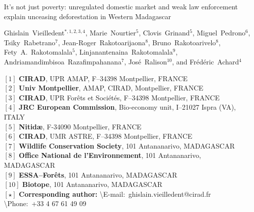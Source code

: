 \begin{center}
  \LARGE{It's not just poverty: unregulated domestic market and weak law enforcement explain unceasing deforestation in Western Madagascar}
\end{center}

\vspace{1cm}

\begin{center}
  \large{Ghislain~Vieilledent$^{*,1,2,3,4}$, Marie~Nourtier$^5$, Clovis~Grinand$^5$, Miguel~Pedrono$^6$,     Tsiky~Rabetrano$^7$, Jean-Roger~Rakotoarijaona$^8$, Bruno~Rakotoarivelo$^8$, Fety~A.~Rakotomalala$^5$, 
  Linjanantenaina~Rakotomalala$^9$, Andriamandimbisoa~Razafimpahanana$^7$, 
  José~Ralison$^{10}$, and Frédéric~Achard$^4$}
\end{center}

\vspace{1cm}

{\small
  \begin{flushleft}
    $[1]$ \textbf{CIRAD}, UPR AMAP, F--34398 Montpellier, FRANCE\\ 
    $[2]$ \textbf{Univ Montpellier}, AMAP, CIRAD, Montpellier, FRANCE\\
    $[3]$ \textbf{CIRAD}, UPR Forêts et Sociétés, F--34398 Montpellier, FRANCE\\
    $[4]$ \textbf{JRC European Commission}, Bio-economy unit, I--21027 Ispra (VA), ITALY\\
    $[5]$ \textbf{Nitid\ae}, F-34090 Montpellier, FRANCE\\
    $[6]$ \textbf{CIRAD}, UMR ASTRE, F--34398 Montpellier, FRANCE\\
    $[7]$ \textbf{Wildlife Conservation Society}, 101 Antananarivo, MADAGASCAR\\
    $[8]$ \textbf{Office National de l'Environnement}, 101 Antananarivo, MADAGASCAR\\
    $[9]$ \textbf{ESSA--Forêts}, 101 Antananarivo, MADAGASCAR\\
    $[10]$ \textbf{Biotope}, 101 Antananarivo, MADAGASCAR
    ~\\
    $[\star]$ \textbf{Corresponding author:}
    \textbackslash{E-mail}:~ghislain.vieilledent@cirad.fr
    \textbackslash{Phone}:~+33 4 67 61 49 09\\
  \end{flushleft}}
\newpage
